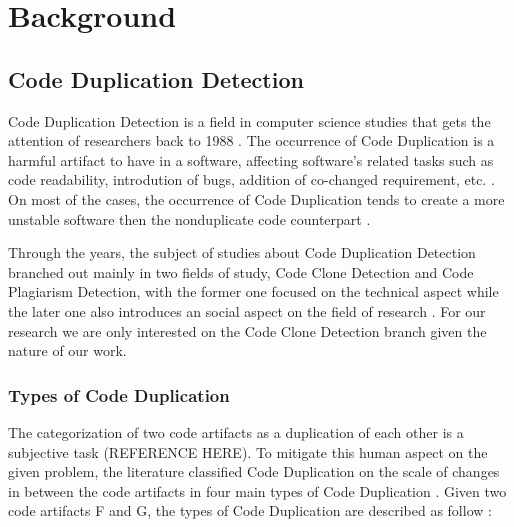 
\en

\chapter{Background}

\section{Code Duplication Detection}

Code Duplication Detection is a field in computer science studies that gets the attention of researchers back to 1988 \citep{firstman}.
The occurrence of Code Duplication is a harmful artifact to have in a software, affecting software's related tasks such as code readability,
introdution of bugs, addition of co-changed requirement, etc.   \citep{harmone}. 
On most of the cases, the occurrence of Code Duplication tends to create a more unstable software then the nonduplicate code counterpart   \citep{harmtwo}.

Through the years, the subject of studies about Code Duplication Detection branched out mainly in two fields of study,
Code Clone Detection and Code Plagiarism Detection,
with the former one focused on the technical aspect while the later one also introduces an social aspect on the field of research
\citep{litreview}. For our research we are only interested on the Code Clone Detection branch given the nature of our work.



\subsection{Types of Code Duplication}

The categorization of two code artifacts as a duplication of each other is a subjective task (REFERENCE HERE). 
To mitigate this human aspect on the given problem, the literature classified Code Duplication on the scale of changes in between 
the code artifacts in four main types of Code Duplication \citep{litreview}. Given two code artifacts F and G, 
the types of Code Duplication are described as follow \citep{litreview}:

